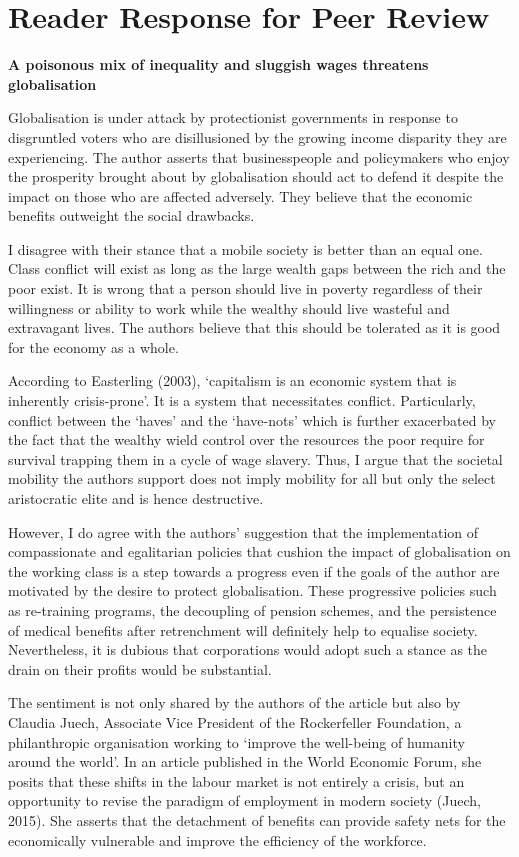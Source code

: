 \documentclass[]{article}
\date{}
\begin{document}
\section{Reader Response for Peer
Review}\label{reader-response-for-peer-review}

\textbf{A poisonous mix of inequality and sluggish wages threatens
globalisation}

Globalisation is under attack by protectionist governments in response
to disgruntled voters who are disillusioned by the growing income
disparity they are experiencing. The author asserts that businesspeople
and policymakers who enjoy the prosperity brought about by globalisation
should act to defend it despite the impact on those who are affected
adversely. They believe that the economic benefits outweight the social
drawbacks.

I disagree with their stance that a mobile society is better than an
equal one. Class conflict will exist as long as the large wealth gaps
between the rich and the poor exist. It is wrong that a person should
live in poverty regardless of their willingness or ability to work while
the wealthy should live wasteful and extravagant lives. The authors
believe that this should be tolerated as it is good for the economy as a
whole.

According to Easterling (2003), `capitalism is an economic system that
is inherently crisis-prone'. It is a system that necessitates conflict.
Particularly, conflict between the `haves' and the `have-nots' which is
further exacerbated by the fact that the wealthy wield control over the
resources the poor require for survival trapping them in a cycle of wage
slavery. Thus, I argue that the societal mobility the authors support
does not imply mobility for all but only the select aristocratic elite
and is hence destructive.

However, I do agree with the authors' suggestion that the implementation
of compassionate and egalitarian policies that cushion the impact of
globalisation on the working class is a step towards a progress even if
the goals of the author are motivated by the desire to protect
globalisation. These progressive policies such as re-training programs,
the decoupling of pension schemes, and the persistence of medical
benefits after retrenchment will definitely help to equalise society.
Nevertheless, it is dubious that corporations would adopt such a stance
as the drain on their profits would be substantial.

The sentiment is not only shared by the authors of the article but also
by Claudia Juech, Associate Vice President of the Rockerfeller
Foundation, a philanthropic organisation working to `improve the
well-being of humanity around the world'. In an article published in the
World Economic Forum, she posits that these shifts in the labour market
is not entirely a crisis, but an opportunity to revise the paradigm of
employment in modern society (Juech, 2015). She asserts that the
detachment of benefits can provide safety nets for the economically
vulnerable and improve the efficiency of the workforce.
\end{document}

